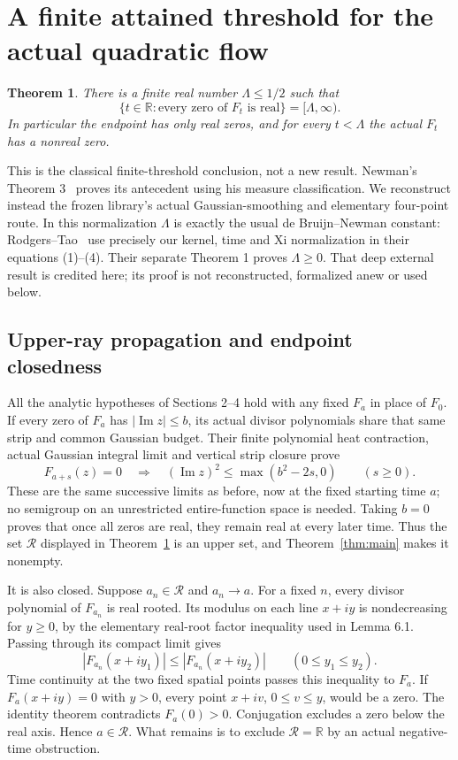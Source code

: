 \documentclass[11pt]{article}
\newtheorem{theorem}{Theorem}[section]
\newcommand{\R}{\mathbb R}\newcommand{\C}{\mathbb C}
\begin{document}
\section{A finite attained threshold for the actual quadratic flow}
\begin{theorem}\label{thm:finitethreshold}
There is a finite real number $\Lambda\leq1/2$ such that
\[
 \{t\in\R: \text{every zero of }F_t\text{ is real}\}=[\Lambda,\infty).
\]
In particular the endpoint has only real zeros, and for every
$t<\Lambda$ the actual $F_t$ has a nonreal zero.
\end{theorem}
This is the classical finite-threshold conclusion, not a new result.
Newman's Theorem 3~\cite{Newman} proves its antecedent using his
measure classification. We reconstruct instead the frozen library's
actual Gaussian-smoothing and elementary four-point route. In this
normalization $\Lambda$ is exactly the usual de Bruijn--Newman constant:
Rodgers--Tao~\cite{RodgersTao} use precisely our kernel, time and Xi
normalization in their equations (1)--(4). Their separate Theorem 1
proves $\Lambda\geq0$. That deep external result is credited here;
its proof is not reconstructed, formalized anew or used below.

\subsection*{Upper-ray propagation and endpoint closedness}
All the analytic hypotheses of Sections 2--4 hold with any fixed
$F_a$ in place of $F_0$. If every zero of $F_a$ has
$|\operatorname{Im}z|\leq b$, its actual divisor polynomials share
that same strip and common Gaussian budget. Their finite polynomial
heat contraction, actual Gaussian integral limit and vertical strip
closure prove
\[
 F_{a+s}(z)=0\quad\Longrightarrow\quad
 (\operatorname{Im}z)^2\leq\max(b^2-2s,0)\qquad(s\geq0).
\]
These are the same successive limits as before, now at the fixed
starting time $a$; no semigroup on an unrestricted entire-function
space is needed. Taking $b=0$ proves that once all zeros are real,
they remain real at every later time. Thus the set $\mathcal R$
displayed in Theorem~\ref{thm:finitethreshold} is an upper set,
and Theorem~\ref{thm:main} makes it nonempty.

It is also closed. Suppose $a_n\in\mathcal R$ and $a_n\to a$.
For a fixed $n$, every divisor polynomial of $F_{a_n}$ is real rooted.
Its modulus on each line $x+iy$ is nondecreasing for $y\geq0$, by
the elementary real-root factor inequality used in Lemma 6.1.
Passing through its compact limit gives
\[
 |F_{a_n}(x+iy_1)|\leq|F_{a_n}(x+iy_2)|
 \qquad(0\leq y_1\leq y_2).
\]
Time continuity at the two fixed spatial points passes this inequality
to $F_a$. If $F_a(x+iy)=0$ with $y>0$, every point $x+iv$,
$0\leq v\leq y$, would be a zero. The identity theorem contradicts
$F_a(0)>0$. Conjugation excludes a zero below the real axis.
Hence $a\in\mathcal R$. What remains is to exclude
$\mathcal R=\R$ by an actual negative-time obstruction.
\end{document}
